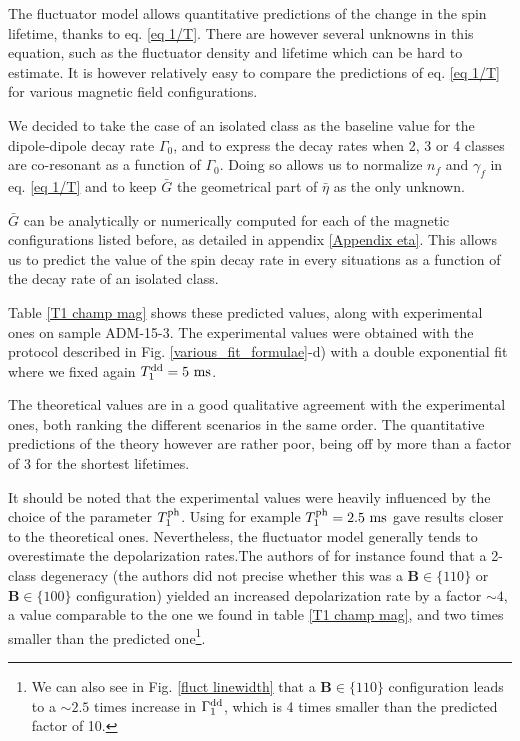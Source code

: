 \documentclass[a4paper, 11pt]{report}
\begin{document}
The fluctuator model allows quantitative predictions of the change in the spin lifetime, thanks to eq. \ref{eq 1/T}. There are however several unknowns in this equation, such as the fluctuator density and lifetime which can be hard to estimate. It is however relatively easy to compare the predictions of eq. \ref{eq 1/T} for various magnetic field configurations.

We decided to take the case of an isolated class as the baseline value for the dipole-dipole decay rate $\Gamma_0$, and to express the decay rates when 2, 3 or 4 classes are co-resonant as a function of $\Gamma_0$. Doing so allows us to normalize $n_f$ and $\gamma_f$ in eq. \ref{eq 1/T} and to keep $\bar G$ the geometrical part of $\bar \eta$ as the only unknown.

$\bar G$ can be analytically or numerically computed for each of the magnetic configurations listed before, as detailed in appendix \ref{Appendix eta}. This allows us to predict the value of the spin decay rate in every situations as a function of the decay rate of an isolated class.

Table \ref{T1 champ mag} shows these predicted values, along with experimental ones on sample ADM-15-3. The experimental values were obtained with the protocol described in Fig. \ref{various_fit_formulae}-d) with a double exponential fit where we fixed again $T_1^{\rm dd}=5\ \rm ms$.

The theoretical values are in a good qualitative agreement with the experimental ones, both ranking the different scenarios in the same order. The quantitative predictions of the theory however are rather poor, being off by more than a factor of 3 for the shortest lifetimes.

It should be noted that the experimental values were heavily influenced by the choice of the parameter $T_1^{\rm ph}$. Using for example $T_1^{\rm ph}=2.5\ \rm ms$ gave results closer to the theoretical ones. Nevertheless, the fluctuator model generally tends to overestimate the depolarization rates.The authors of \citep{choi2017depolarization} for instance found that a 2-class degeneracy (the authors did not precise whether this was a $\mathbf{B} \in \{110\}$ or $\mathbf{B} \in \{100\}$ configuration) yielded an increased depolarization rate by a factor $\sim 4$, a value comparable to the one we found in table \ref{T1 champ mag}, and two times smaller than the predicted one\footnote{We can also see in Fig. \ref{fluct linewidth} that a $\mathbf{B} \in \{110\}$ configuration leads to a $\sim 2.5$ times increase in $\Gamma_1^{\rm dd}$, which is 4 times smaller than the predicted factor of 10.}.
\end{document}
